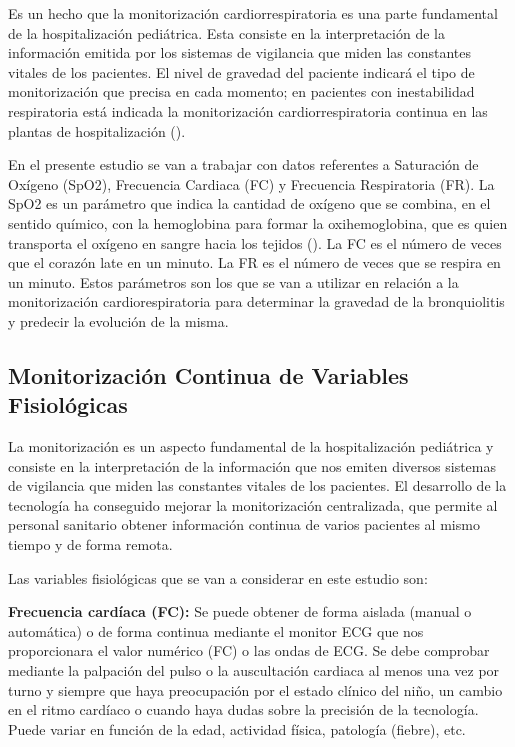Es un hecho que la monitorización cardiorrespiratoria es una parte fundamental de la hospitalización pediátrica. Esta consiste en la interpretación de la información emitida por los sistemas de vigilancia que miden las constantes vitales de los pacientes. El nivel de gravedad del paciente indicará el tipo de monitorización que precisa en cada momento; en pacientes con inestabilidad respiratoria está indicada la monitorización cardiorrespiratoria continua en las plantas de hospitalización (\cite{AmandaC}).

En el presente estudio se van a trabajar con datos referentes a Saturación de Oxígeno (SpO2), Frecuencia Cardiaca (FC) y Frecuencia Respiratoria (FR). La SpO2 es un parámetro que indica la cantidad de oxígeno que se combina, en el sentido químico, con la hemoglobina para formar la oxihemoglobina, que es quien transporta el oxígeno en sangre hacia los tejidos (\cite{Laborde2004}). La FC es el número de veces que el corazón late en un minuto. La FR es el número de veces que se respira en un minuto. Estos parámetros son los que se van a utilizar en relación a la monitorización cardiorespiratoria para determinar la gravedad de la bronquiolitis y predecir la evolución de la misma.

\subsection{Monitorización Continua de Variables Fisiológicas}

La monitorización es un aspecto fundamental de la hospitalización pediátrica y consiste en la interpretación de la información que nos emiten diversos sistemas de vigilancia que miden las constantes vitales de los pacientes. El desarrollo de la tecnología ha conseguido mejorar la monitorización centralizada, que permite al personal sanitario obtener información continua de varios pacientes al mismo tiempo y de forma remota.

Las variables fisiológicas que se van a considerar en este estudio son: 

\textbf{Frecuencia cardíaca (FC):} Se puede obtener de forma aislada (manual o automática) o de forma continua mediante el monitor ECG que nos proporcionara el valor numérico (FC) o las ondas de ECG. Se debe comprobar mediante la palpación del pulso o la auscultación cardiaca al menos una vez por turno y siempre que haya preocupación por el estado clínico del niño, un cambio en el ritmo cardíaco o cuando haya dudas sobre la precisión de la tecnología. Puede variar en función de la edad, actividad física, patología (fiebre), etc. 

